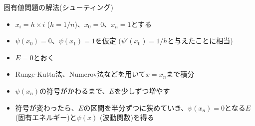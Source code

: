 \begin{frame}[t,fragile]{固有値問題の解法(シューティング)}
  \begin{itemize}
    \setlength{\itemsep}{1em}
  \item $x_i=h \times i$ ($h=1/n$)、$x_0=0$、$x_n=1$とする
  \item $\psi(x_0)=0$、$\psi(x_1) = 1$を仮定 ($\psi'(x_0)=1/h$と与えたことに相当)
  \item $E = 0$とおく
  \item Runge-Kutta法、Numerov法などを用いて$x=x_n$まで積分
  \item $\psi(x_n)$の符号がかわるまで、$E$を少しずつ増やす
  \item 符号が変わったら、$E$の区間を半分ずつに狭めていき、$\psi(x_n)=0$となる$E$ (固有エネルギー)と$\psi(x)$ (波動関数)を得る
  \end{itemize}
\end{frame}
